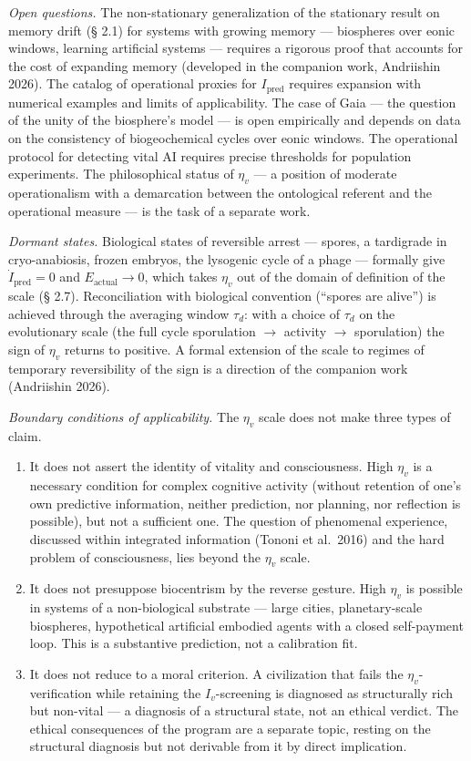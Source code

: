 \documentclass[pdflatex,sn-mathphys-ay]{sn-jnl}
\providecommand{\tightlist}{\setlength{\itemsep}{0pt}\setlength{\parskip}{0pt}}
\begin{document}
\emph{Open questions.} The non-stationary generalization of the stationary result on memory drift (§ 2.1) for systems with growing memory --- biospheres over eonic windows, learning artificial systems --- requires a rigorous proof that accounts for the cost of expanding memory (developed in the companion work, Andriishin 2026). The catalog of operational proxies for \(I_{\text{pred}}\) requires expansion with numerical examples and limits of applicability. The case of Gaia --- the question of the unity of the biosphere's model --- is open empirically and depends on data on the consistency of biogeochemical cycles over eonic windows. The operational protocol for detecting vital AI requires precise thresholds for population experiments. The philosophical status of \(\eta_v\) --- a position of moderate operationalism with a demarcation between the ontological referent and the operational measure --- is the task of a separate work.

\emph{Dormant states.} Biological states of reversible arrest --- spores, a tardigrade in cryo-anabiosis, frozen embryos, the lysogenic cycle of a phage --- formally give \(\dot{I}_{\text{pred}} = 0\) and \(E_{\text{actual}} \to 0\), which takes \(\eta_v\) out of the domain of definition of the scale (§ 2.7). Reconciliation with biological convention (``spores are alive'') is achieved through the averaging window \(\tau_d\): with a choice of \(\tau_d\) on the evolutionary scale (the full cycle sporulation \(\to\) activity \(\to\) sporulation) the sign of \(\eta_v\) returns to positive. A formal extension of the scale to regimes of temporary reversibility of the sign is a direction of the companion work (Andriishin 2026).

\emph{Boundary conditions of applicability.} The \(\eta_v\) scale does not make three types of claim.

\begin{enumerate}
\def\labelenumi{\arabic{enumi}.}
\tightlist
\item
  It does not assert the identity of vitality and consciousness. High \(\eta_v\) is a necessary condition for complex cognitive activity (without retention of one's own predictive information, neither prediction, nor planning, nor reflection is possible), but not a sufficient one. The question of phenomenal experience, discussed within integrated information (Tononi et al.~2016) and the hard problem of consciousness, lies beyond the \(\eta_v\) scale.
\item
  It does not presuppose biocentrism by the reverse gesture. High \(\eta_v\) is possible in systems of a non-biological substrate --- large cities, planetary-scale biospheres, hypothetical artificial embodied agents with a closed self-payment loop. This is a substantive prediction, not a calibration fit.
\item
  It does not reduce to a moral criterion. A civilization that fails the \(\eta_v\)-verification while retaining the \(I_v\)-screening is diagnosed as structurally rich but non-vital --- a diagnosis of a structural state, not an ethical verdict. The ethical consequences of the program are a separate topic, resting on the structural diagnosis but not derivable from it by direct implication.
\end{enumerate}
\end{document}
